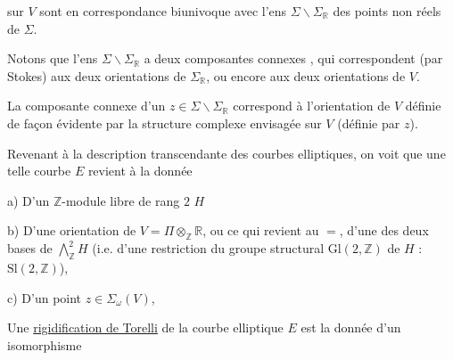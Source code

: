 sur $V$ sont en correspondance biunivoque avec l'ens $\Sigma\smallsetminus\Sigma_{\mathbb R}$ des points non réels de $\Sigma$.

Notons que l'ens $\Sigma\smallsetminus\Sigma_{\mathbb R}$ a deux composantes connexes \inserted{$\Sigma_\omega^*$}, qui correspondent (par Stokes) aux deux orientations de $\Sigma_{\mathbb R}$, ou encore aux deux orientations de $V$.

La composante connexe d'un $z\in\Sigma\smallsetminus\Sigma_{\mathbb R}$ correspond à l'orientation de $V$ définie de façon évidente par la structure complexe envisagée sur $V$ (définie par $z$).

Revenant à la description transcendante des courbes elliptiques, on voit que une telle courbe $E$ revient à la donnée

a) D'un $\mathbb Z$-module libre de rang $2$ $H$

b) D'une  orientation \inserted{$\omega$} de $V=\Pi\otimes_{\mathbb Z}\mathbb R$, ou ce qui revient au $=$, d'une des deux bases de $\bigwedge_{\mathbb Z}^2H$ (i.e. d'une restriction du groupe structural $\mathrm{Gl}(2,\mathbb Z)$ de $H$ : $\mathrm{Sl}(2,\mathbb Z)$), 

c) D'un point $z\in\Sigma_\omega(V)$,

Une \uline{rigidification de Torelli} de la courbe elliptique $E$ est la donnée d'un isomorphisme
